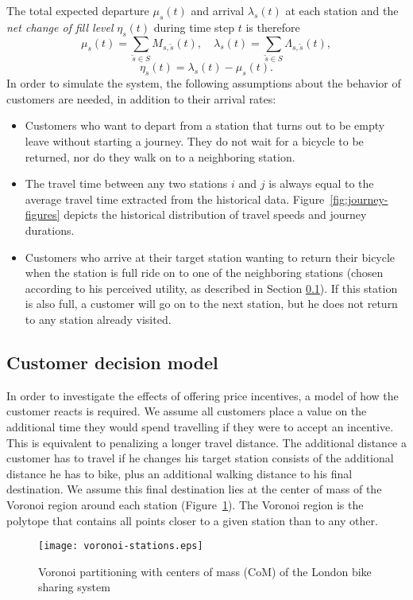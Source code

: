 \documentclass{article}
\begin{document}
The total expected departure $\mu_s(t)$ and arrival $\lambda_s(t)$ at each station and
the \emph{net change of fill level} $\eta_s(t)$ during time step $t$ is therefore
\begin{equation}
  \mu_s(t) = \sum_{\tilde s\in S} M_{s, \tilde s}(t),\hspace{1em} \lambda_s(t) = \sum_{\tilde s\in S}\Lambda_{s,\tilde s}(t),
\end{equation}
\begin{equation}
  \label{eq:eta}
  \eta_s(t) = \lambda_s(t) - \mu_s(t).
\end{equation}
In order to simulate the system, the following assumptions about the behavior of
customers are needed, in addition to their arrival rates:
\begin{itemize}
\item Customers who want to depart from a station that turns out to be empty leave without starting a journey. They do not wait for a bicycle to be
  returned, nor do they walk on to a neighboring station.
\item The travel time between any two stations $i$ and $j$ is always equal to
  the average travel time extracted from the historical data.
  Figure~\ref{fig:journey-figures} depicts the historical distribution of travel
  speeds and journey durations.
\item Customers who arrive at their target station wanting to return their
  bicycle when the station is full ride on to one of the neighboring stations
  (chosen according to his perceived utility, as described in Section
  \ref{sec:cust-react-incent}). If this station is also full, a customer will go
  on to the next station, but he does not return to any station already visited.
\end{itemize}

\subsection{Customer decision model}
\label{sec:cust-react-incent}
In order to investigate the effects of offering price incentives, a model of how
the customer reacts is required. We assume all customers place a value on the
additional time they would spend travelling if they were to accept an incentive.
This is equivalent to penalizing a longer travel distance. The additional
distance a customer has to travel if he changes his target station consists of
the additional distance he has to bike, plus an additional walking distance to
his final destination. We assume this final destination lies at the center of
mass of the Voronoi region around each station
(Figure~\ref{fig:voronoi-system}). The Voronoi region is the polytope that contains
all points closer to a given station than to any other.
\begin{figure}[ht]
    \centering
    \texttt{[image: voronoi-stations.eps]}
    \caption{Voronoi partitioning with centers of mass (CoM) of the
      London bike sharing system}
    \label{fig:voronoi-system}
\end{figure}
\end{document}
